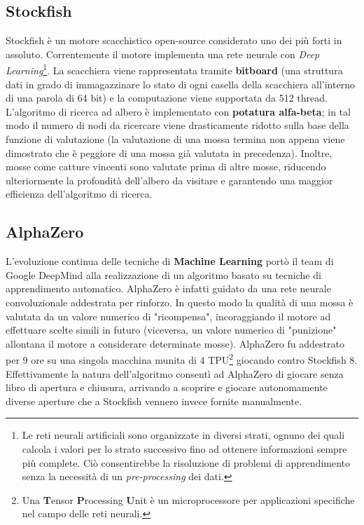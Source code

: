 \subsection{Stockfish}
Stockfish è un motore scacchistico open-source considerato uno dei più forti in assoluto. Correntemente il motore implementa una rete neurale con \textit{Deep Learning}\footnote{Le reti neurali artificiali sono organizzate in diversi strati, ognuno dei quali calcola i valori per lo strato successivo fino ad ottenere informazioni sempre più complete. Ciò consentirebbe la risoluzione di problemi di apprendimento senza la necessità di un \textit{pre-processing} dei dati.}. 
La scacchiera viene rappresentata tramite \textbf{bitboard} (una struttura dati in grado di immagazzinare lo stato di ogni casella della scacchiera all’interno di una parola di 64 bit) e la computazione viene supportata da 512 thread. L'algoritmo di ricerca ad albero è implementato con \textbf{potatura alfa-beta}; in tal modo il numero di nodi da ricercare viene drasticamente ridotto sulla base della funzione di valutazione (la valutazione di una mossa termina non appena viene dimostrato che è peggiore di una mossa già valutata in precedenza). Inoltre, mosse come catture vincenti sono valutate prima di altre mosse, riducendo ulteriormente la profondità dell'albero da visitare e garantendo una maggior efficienza dell'algoritmo di ricerca.

\subsection{AlphaZero}
L'evoluzione continua delle tecniche di \textbf{Machine Learning} portò il team di Google DeepMind alla realizzazione di un algoritmo basato su tecniche di apprendimento automatico. AlphaZero è infatti guidato da una rete neurale convoluzionale addestrata per rinforzo. In questo modo la qualità di una mossa è valutata da un valore numerico di "ricompensa", incoraggiando il motore ad effettuare scelte simili in futuro (viceversa, un valore numerico di "punizione" allontana il motore a considerare determinate mosse). AlphaZero fu addestrato per 9 ore su una singola macchina munita di 4 TPU\footnote{Una \textbf{T}ensor \textbf{P}rocessing \textbf{U}nit è un microprocessore per applicazioni specifiche nel campo delle reti neurali.} giocando contro Stockfish 8. Effettivamente la natura dell'algoritmo consentì ad AlphaZero di giocare senza libro di apertura e chiusura, arrivando a scoprire e giocare autonomamente diverse aperture che a Stockfish vennero invece fornite manualmente.





\newpage